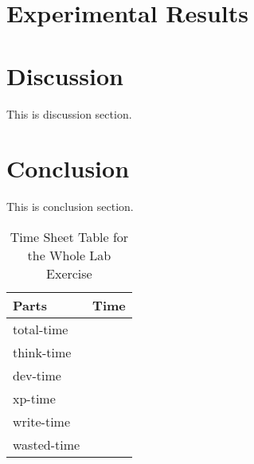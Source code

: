\documentclass[10pt, a4paper, twoside, twocolumn, technote]{IEEEtran}
\begin{document}
\section{Experimental Results}\label{experiment}


\section{Discussion}\label{discussion}
This is discussion section.

\section{Conclusion}\label{conclusion}
This is conclusion section.

\begin{table}
  \caption{Time Sheet Table for the Whole Lab Exercise}
  \centering
  \begin{tabular}{l|l}
    \hline
    Parts       & Time \\
    \hline
    total-time  & \\
    think-time  & \\
    dev-time    & \\
    xp-time     & \\
    write-time  & \\
    wasted-time & \\
    \hline
  \end{tabular}
\end{table}



\end{document}
